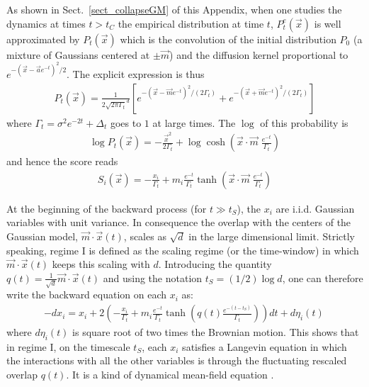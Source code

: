 \documentclass[10pt,twocolumn]{article}
\newcommand{\vx}{\vec x}
\newcommand{\va}{\vec a}
\newcommand{\vm}{\vec m}
\begin{document}
As shown in Sect.~\ref{sect_collapseGM} of this Appendix, when one studies the dynamics at times $t>t_C$  the empirical distribution at time $t$, $P_t^e(\vx)$ is well approximated by $P_t(\vx)$ which is the convolution of the initial distribution $P_0$ (a mixture of Gaussians centered at $\pm \vec m$) and the diffusion kernel proportional to $e^{-(\vx-\va e^{-t})^2/2}$. 
The explicit expression is thus 
\begin{align}
    P_t(\vx) = \frac{1}{2\sqrt{2\pi\Gamma_t}^d}\left[
e^{-(\vx-\vm e^{-t})^2/(2 \Gamma_t)}
+e^{-(\vx+\vm e^{-t})^2/(2 \Gamma_t)}
\right]
\end{align}
where $\Gamma_t=\sigma^2 e^{-2 t}+ \Delta_t$ goes to $1$ at large times.
The $\log$ of this probability is
\begin{align}
   \log P_t(\vx) = -\frac{\vx^2}{2\Gamma_t}+\log \cosh\left( \vec x \cdot \vec m \;\frac{e^{-t}}{\Gamma_t}\right)
\end{align}
and hence the score reads 
\begin{align}\label{eq:scoregm}
   S_i(\vx) = -\frac{x_i}{\Gamma_t}+m_i \frac{e^{-t}}{\Gamma_t}\tanh\left( \vec x \cdot \vec m \; \frac{e^{-t}}{\Gamma_t}\right)
\end{align}

At the beginning of the backward process (for $t\gg t_S$), the $x_i$ are i.i.d. Gaussian variables with unit variance. In consequence the overlap with the centers of the Gaussian model, $\vec m\cdot \vec x(t)$, scales as $\sqrt{d}$ in the large dimensional limit. Strictly speaking, regime I is defined as the scaling regime (or the time-window) in which 
$\vec m\cdot \vec x(t)$ keeps this scaling with $d$. Introducing 
the quantity $q(t)=\frac{1}{\sqrt{d}} \vec m\cdot \vec x(t)$ and using the notation $t_S=(1/2)\log d$, one can therefore write the backward equation on each $x_i$ as:
\begin{align}\label{eq:regimeigm}
-dx_i=x_i+2\left(-\frac{x_i}{\Gamma_t}+m_i \frac{e^{-t}}{\Gamma_t}\tanh\left(q(t) \frac{e^{-(t-t_S)}}{\Gamma_t}\right)\right)dt +d\eta_i(t) \,
\end{align}
where $d\eta_i(t)$ is square root of two times the Brownian motion. 
This shows that in regime I, on the timescale $t_S$, each $x_i$ satisfies a Langevin equation in which the interactions with all the other variables is through the fluctuating rescaled overlap $q(t)$. It is a kind of dynamical mean-field equation \cite{bonnaire2023high}. 
\end{document}
